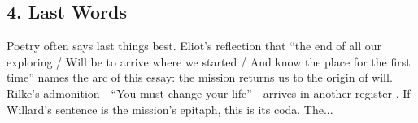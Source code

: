 \subsection*{4. Last Words}
\label{ssec:4-last-words}
Poetry often says last things best. Eliot’s reflection that ``the end of all our exploring / Will be to arrive where we started / And know the place for the first time''  names the arc of this essay: the mission returns us to the origin of will. Rilke’s admonition---``You must change your life''---arrives in another register \parencite[Snow trans., 2009]{RilkeElegies2009}. If Willard’s sentence is the mission’s epitaph, this is its coda. The...
